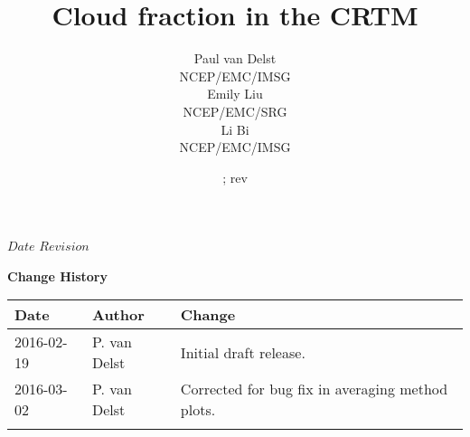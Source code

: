 


\newcommand{\lineacrosspage}{\noindent\rule[0.5ex]{\linewidth}{1pt}}



\SVN $Date$
\SVN $Revision$

\title{Cloud fraction in the CRTM}
\author{Paul van Delst\\NCEP/EMC/IMSG\\[0.25in]
        Emily Liu\\NCEP/EMC/SRG\\[0.25in]
        Li Bi\\NCEP/EMC/IMSG}
\date{\SVNDate ; rev\SVNRevision}



\maketitle

\draftwatermark



\thispagestyle{empty}
\vspace*{10cm}
\begin{center}
  {\sffamily\Large\bfseries Change History}
  \begin{table}[htp]
    \centering
    \begin{tabular}{|p{2cm}|p{3cm}|p{8cm}|}
      \hline
      \sffamily\textbf{Date} & \sffamily\textbf{Author} & \sffamily\textbf{Change}\\
      \hline\hline
      2016-02-19 & P. van Delst & Initial draft release.\\
      \hline
      2016-03-02 & P. van Delst & Corrected for bug fix in averaging method plots. \\
       &  &  \\
      \hline
      \hline
    \end{tabular}
  \end{table}
\end{center}
\clearpage

